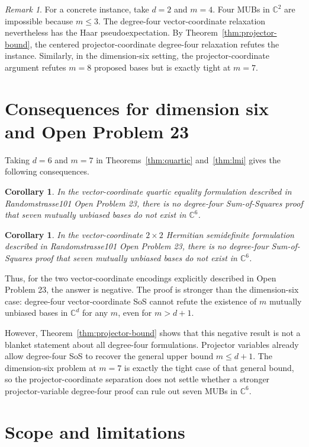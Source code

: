 \documentclass[11pt]{article}
\newtheorem{corollary}[theorem]{Corollary}
\theoremstyle{remark}
\newtheorem{remark}[theorem]{Remark}
\newcommand{\C}{\mathbb{C}}
\begin{document}
\begin{remark}
For a concrete instance, take $d=2$ and $m=4$. Four MUBs in $\C^2$ are impossible because $m\le3$. The degree-four vector-coordinate relaxation nevertheless has the Haar pseudoexpectation. By Theorem~\ref{thm:projector-bound}, the centered projector-coordinate degree-four relaxation refutes the instance. Similarly, in the dimension-six setting, the projector-coordinate argument refutes $m=8$ proposed bases but is exactly tight at $m=7$.
\end{remark}

\section{Consequences for dimension six and Open Problem 23}

Taking $d=6$ and $m=7$ in Theorems~\ref{thm:quartic} and~\ref{thm:lmi} gives the following consequences.

\begin{corollary}
In the vector-coordinate quartic equality formulation described in Randomstrasse101 Open Problem 23, there is no degree-four Sum-of-Squares proof that seven mutually unbiased bases do not exist in $\C^6$.
\end{corollary}

\begin{corollary}
In the vector-coordinate $2\times2$ Hermitian semidefinite formulation described in Randomstrasse101 Open Problem 23, there is no degree-four Sum-of-Squares proof that seven mutually unbiased bases do not exist in $\C^6$.
\end{corollary}

Thus, for the two vector-coordinate encodings explicitly described in Open Problem 23, the answer is negative. The proof is stronger than the dimension-six case: degree-four vector-coordinate SoS cannot refute the existence of $m$ mutually unbiased bases in $\C^d$ for any $m$, even for $m>d+1$.

However, Theorem~\ref{thm:projector-bound} shows that this negative result is not a blanket statement about all degree-four formulations. Projector variables already allow degree-four SoS to recover the general upper bound $m\le d+1$. The dimension-six problem at $m=7$ is exactly the tight case of that general bound, so the projector-coordinate separation does not settle whether a stronger projector-variable degree-four proof can rule out seven MUBs in $\C^6$.

\section{Scope and limitations}
\end{document}
